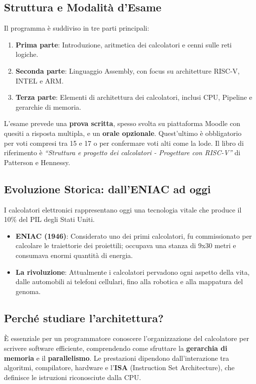 \documentclass[12pt, a4paper]{article}
\begin{document}
\subsection{Struttura e Modalità d'Esame}
Il programma è suddiviso in tre parti principali:
\begin{enumerate}
    \item \textbf{Prima parte}: Introduzione, aritmetica dei calcolatori e cenni sulle reti logiche.
    \item \textbf{Seconda parte}: Linguaggio Assembly, con focus su architetture RISC-V, INTEL e ARM.
    \item \textbf{Terza parte}: Elementi di architettura dei calcolatori, inclusi CPU, Pipeline e gerarchie di memoria.
\end{enumerate}

L'esame prevede una \textbf{prova scritta}, spesso svolta su piattaforma Moodle con quesiti a risposta multipla, e un \textbf{orale opzionale}. Quest'ultimo è obbligatorio per voti compresi tra 15 e 17 o per confermare voti alti come la lode. Il libro di riferimento è \textit{``Struttura e progetto dei calcolatori - Progettare con RISC-V''} di Patterson e Hennessy.

\subsection{Evoluzione Storica: dall'ENIAC ad oggi}
I calcolatori elettronici rappresentano oggi una tecnologia vitale che produce il 10\% del PIL degli Stati Uniti.
\begin{itemize}
    \item \textbf{ENIAC (1946)}: Considerato uno dei primi calcolatori, fu commissionato per calcolare le traiettorie dei proiettili; occupava una stanza di 9x30 metri e consumava enormi quantità di energia.
    \item \textbf{La rivoluzione}: Attualmente i calcolatori pervadono ogni aspetto della vita, dalle automobili ai telefoni cellulari, fino alla robotica e alla mappatura del genoma.
\end{itemize}

\subsection{Perché studiare l'architettura?}
È essenziale per un programmatore conoscere l'organizzazione del calcolatore per scrivere software efficiente, comprendendo come sfruttare la \textbf{gerarchia di memoria} e il \textbf{parallelismo}. Le prestazioni dipendono dall'interazione tra algoritmi, compilatore, hardware e l'\textbf{ISA} (Instruction Set Architecture), che definisce le istruzioni riconosciute dalla CPU.
\end{document}
